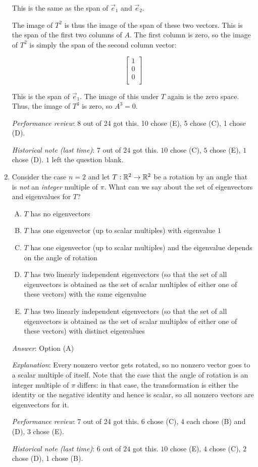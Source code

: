 \documentclass[10pt]{amsart}
\begin{document}
\begin{enumerate}
  This is the same as the span of $\vec{e}_1$ and $\vec{e}_2$.

  The image of $T^2$ is thus the image of the span of these two
  vectors. This is the span of the first two columns of $A$. The first
  column is zero, so the image of $T^2$ is simply the span of the
  second column vector:

  $$\left[\begin{matrix} 1 \\ 0 \\ 0 \\\end{matrix}\right]$$

  This is the span of $\vec{e}_1$. The image of this under $T$ again
  is the zero space. Thus, the image of $T^3$ is zero, so $A^3 = 0$.

  {\em Performance review}: 8 out of 24 got this. 10 chose (E), 5
  chose (C), 1 chose (D).

  {\em Historical note (last time)}: $7$ out of $24$ got this. $10$ chose (C),
  $5$ chose (E), $1$ chose (D). $1$ left the question blank.

\item Consider the case $n = 2$ and let $T:\mathbb{R}^2 \to \mathbb{R}^2$ be a
  rotation by an angle that is {\em not} an {\em integer} multiple of
  $\pi$. What can we say about the set of eigenvectors and eigenvalues
  for $T$?

  \begin{enumerate}[(A)]
  \item $T$ has no eigenvectors
  \item $T$ has one eigenvector (up to scalar multiples) with
    eigenvalue $1$
  \item $T$ has one eigenvector (up to scalar multiples) and the
    eigenvalue depends on the angle of rotation
  \item $T$ has two linearly independent eigenvectors (so that the set
    of all eigenvectors is obtained as the set of scalar multiples of
    either one of these vectors) with the same eigenvalue
  \item $T$ has two linearly independent eigenvectors (so that the set
    of all eigenvectors is obtained as the set of scalar multiples of
    either one of these vectors) with distinct eigenvalues
  \end{enumerate}

  {\em Answer}: Option (A)

  {\em Explanation}: Every nonzero vector gets rotated, so no nonzero
  vector goes to a scalar multiple of itself. Note that the case that
  the angle of rotation is an integer multiple of $\pi$ differs: in
  that case, the transformation is either the identity or the negative
  identity and hence is scalar, so all nonzero vectors are
  eigenvectors for it.

  {\em Performance review}: 7 out of 24 got this. 6 chose (C), 4 each
  chose (B) and (D), 3 chose (E).

  {\em Historical note (last time)}: $6$ out of $24$ got this. $10$ chose (E),
  $4$ chose (C), $2$ chose (D), $1$ chose (B).
\end{enumerate}
\end{document}

